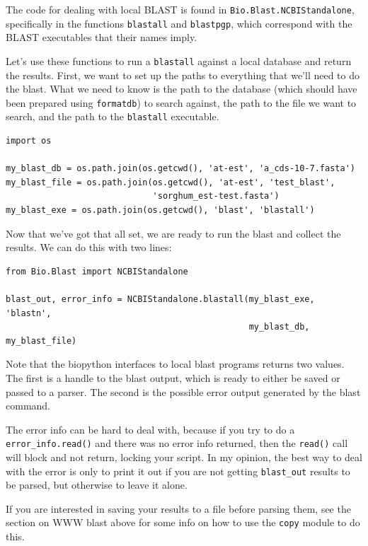 \documentclass{article}
\begin{document}
The code for dealing with local BLAST is found in \verb|Bio.Blast.NCBIStandalone|, specifically in the functions \verb|blastall| and \verb|blastpgp|, which correspond with the BLAST executables that their names imply.


Let's use these functions to run a \verb|blastall| against a local database and return the results. First, we want to set up the paths to everything that we'll need to do the blast. What we need to know is the path to the database (which should have been prepared using \verb|formatdb|) to search against, the path to the file we want to search, and the path to the \verb|blastall| executable.

\begin{verbatim}
import os

my_blast_db = os.path.join(os.getcwd(), 'at-est', 'a_cds-10-7.fasta')
my_blast_file = os.path.join(os.getcwd(), 'at-est', 'test_blast',
                             'sorghum_est-test.fasta')
my_blast_exe = os.path.join(os.getcwd(), 'blast', 'blastall')
\end{verbatim}

Now that we've got that all set, we are ready to run the blast and collect the results. We can do this with two lines:

\begin{verbatim}
from Bio.Blast import NCBIStandalone

blast_out, error_info = NCBIStandalone.blastall(my_blast_exe, 'blastn',
                                                my_blast_db, my_blast_file)
\end{verbatim}

Note that the biopython interfaces to local blast programs returns two values. The first is a handle to the blast output, which is ready to either be saved or passed to a parser. The second is the possible error output generated by the blast command.


The error info can be hard to deal with, because if you try to do a \verb|error_info.read()| and there was no error info returned, then the \verb|read()| call will block and not return, locking your script. In my opinion, the best way to deal with the error is only to print it out if you are not getting \verb|blast_out| results to be parsed, but otherwise to leave it alone.


If you are interested in saving your results to a file before parsing them, see the section on WWW blast above for some info on how to use the \verb|copy| module to do this.
\end{document}
